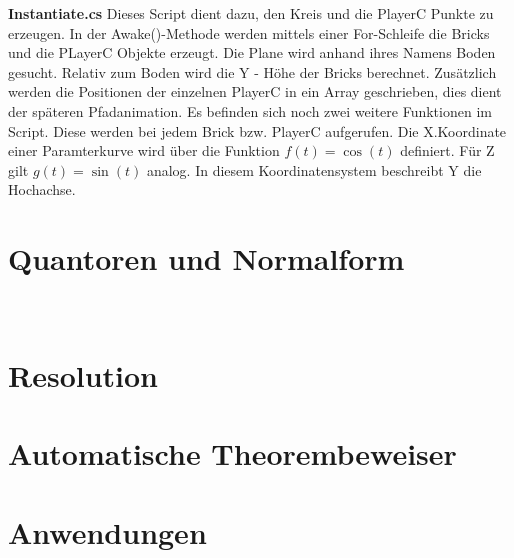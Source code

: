 \textbf{Instantiate.cs}
Dieses Script dient dazu, den Kreis und die PlayerC Punkte zu erzeugen. In der Awake()-Methode werden mittels einer For-Schleife
die Bricks und die PLayerC Objekte erzeugt. Die Plane wird anhand ihres Namens \glqq Boden{}\grqq{} gesucht. Relativ zum Boden wird die Y - Höhe der Bricks berechnet.
Zusätzlich werden die Positionen der einzelnen PlayerC in ein Array geschrieben, dies dient der späteren Pfadanimation.
Es befinden sich noch zwei weitere Funktionen im Script. Diese werden bei jedem Brick bzw. PlayerC aufgerufen. Die X.Koordinate einer Paramterkurve wird über die Funktion $ f(t) = \cos(t) $ definiert. Für Z gilt $g(t) = \sin(t) $ analog. In diesem Koordinatensystem beschreibt Y die Hochachse.

\section{Quantoren und Normalform}
\
\section{Resolution}
\label{Resolution}

\section{Automatische Theorembeweiser}
\label{Automatische Theorembeweiser}


\section{Anwendungen}
\label{Anwendung}
